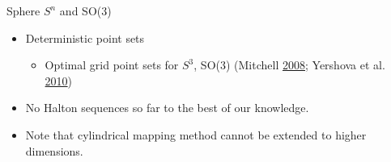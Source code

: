 \documentclass[10pt,ignorenonframetext,serif,onlymath]{beamer}
\providecommand{\tightlist}{%
  \setlength{\itemsep}{0pt}\setlength{\parskip}{0pt}}
\begin{document}
\begin{frame}{Sphere \(S^n\) and SO(3)}
\protect\hypertarget{sub:sphere_s_n_and_so_3_}{}

\begin{itemize}
\item
  Deterministic point sets

  \begin{itemize}
  \tightlist
  \item
    Optimal grid point sets for \(S^3\), SO(3) (Mitchell
    \protect\hyperlink{ref-mitchell2008sampling}{2008}; Yershova et al.
    \protect\hyperlink{ref-yershova2010generating}{2010})
  \end{itemize}
\item
  No Halton sequences so far to the best of our knowledge.
\item
  Note that cylindrical mapping method cannot be extended to higher
  dimensions.
\end{itemize}

\end{frame}
\end{document}
